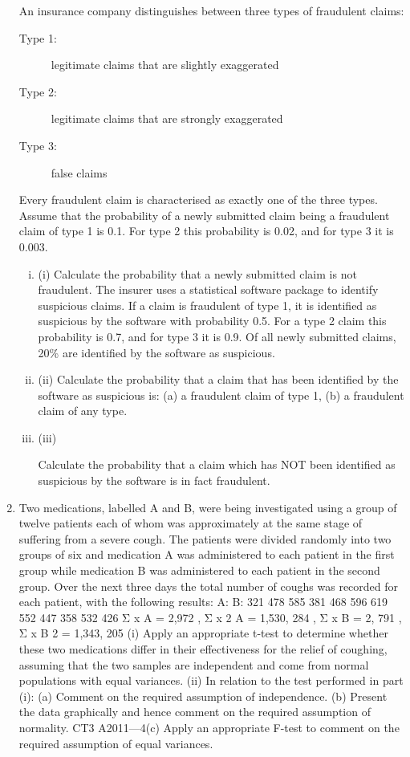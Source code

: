 \documentclass[a4paper,12pt]{article}
\begin{document}
\begin{enumerate}
An insurance company distinguishes between three types of fraudulent claims:
\begin{description}
\item[Type 1:] legitimate claims that are slightly exaggerated
\item[Type 2:] legitimate claims that are strongly exaggerated
\item[Type 3:] false claims
\end{description}
Every fraudulent claim is characterised as exactly one of the three types. Assume that the probability of a newly submitted claim being a fraudulent claim of type 1 is 0.1.
For type 2 this probability is 0.02, and for type 3 it is 0.003.
\begin{enumerate}[(i)]
\item (i) Calculate the probability that a newly submitted claim is not fraudulent.
The insurer uses a statistical software package to identify suspicious claims. If a claim is fraudulent of type 1, it is identified as suspicious by the software with probability 0.5. For a type 2 claim this probability is 0.7, and for type 3 it is 0.9.
Of all newly submitted claims, 20\% are identified by the software as suspicious.
\item (ii)
Calculate the probability that a claim that has been identified by the software as suspicious is:
(a) a fraudulent claim of type 1,
(b) a fraudulent claim of any type.
\item (iii)

Calculate the probability that a claim which has NOT been identified as
suspicious by the software is in fact fraudulent.
\end{enumerate} 
\item Two medications, labelled A and B, were being investigated using a group of twelve patients each of whom was approximately at the same stage of suffering from a severe cough. The patients were divided randomly into two groups of six and medication A
was administered to each patient in the first group while medication B was administered to each patient in the second group. Over the next three days the total number of coughs was recorded for each patient, with the following results:
A:
B:
321
478
585
381
468
596
619
552
447
358
532
426
Σ x A = 2,972 , Σ x 2 A = 1,530, 284 , Σ x B = 2, 791 , Σ x B 2 = 1,343, 205
(i) Apply an appropriate t-test to determine whether these two medications differ in their effectiveness for the relief of coughing, assuming that the two samples are independent and come from normal populations with equal variances. 
(ii) In relation to the test performed in part (i):
(a) Comment on the required assumption of independence.
(b) Present the data graphically and hence comment on the required assumption of normality.
CT3 A2011—4(c)
Apply an appropriate F-test to comment on the required assumption of equal variances.


\end{enumerate}
\end{document}
